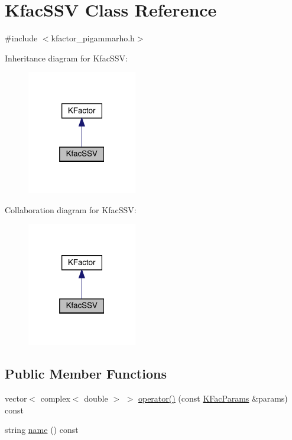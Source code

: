 \hypertarget{classKfacSSV}{}\section{Kfac\+S\+SV Class Reference}
\label{classKfacSSV}


{\ttfamily \#include $<$kfactor\+\_\+pigammarho.\+h$>$}



Inheritance diagram for Kfac\+S\+SV\+:
\nopagebreak
\begin{figure}[H]
\begin{center}
\leavevmode
\includegraphics[width=136pt]{df/dda/classKfacSSV__inherit__graph}
\end{center}
\end{figure}


Collaboration diagram for Kfac\+S\+SV\+:
\nopagebreak
\begin{figure}[H]
\begin{center}
\leavevmode
\includegraphics[width=136pt]{de/da3/classKfacSSV__coll__graph}
\end{center}
\end{figure}
\subsection*{Public Member Functions}
\begin{DoxyCompactItemize}
\item 
vector$<$ complex$<$ double $>$ $>$ \mbox{\hyperlink{classKfacSSV_aeea4f3f068452d233d4111d72c05cd4f}{operator()}} (const \mbox{\hyperlink{classKFacParams}{K\+Fac\+Params}} \&params) const
\item 
string \mbox{\hyperlink{classKfacSSV_a72d5e577525fa97365dbcfd4c5bea88d}{name}} () const
\end{DoxyCompactItemize}


